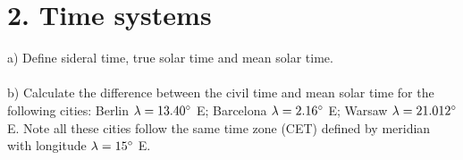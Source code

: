 \section*{2. Time systems}

a) Define sideral time, true solar time and mean solar time.\\
\\
b) Calculate the difference between the civil time and mean solar time for the following cities: Berlin
$\lambda = 13.40 \degree$ E; Barcelona $\lambda = 2.16 \degree$ E; Warsaw $\lambda = 21.012 \degree$ E.
Note all these cities follow the same time zone (CET) defined by meridian with longitude 
$\lambda = 15 \degree$ E.\\
\\
